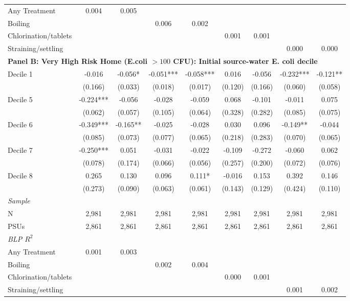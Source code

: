 \begin{landscape}
\begin{table}[p]
\begin{adjustbox}{max width=\linewidth, center}
\begin{tabular}{lcccccccc}
\quad Any Treatment & 0.004 & 0.005 &  &  &  &  &  &  \\
\quad Boiling &  &  & 0.006 & 0.002 &  &  &  &  \\
\quad Chlorination/tablets &  &  &  &  & 0.001 & 0.001 &  &  \\
\quad Straining/settling &  &  &  &  &  &  & 0.000 & 0.000 \\
\midrule
\multicolumn{9}{l}{\textbf{Panel B: Very High Risk Home (E.coli $>100$ CFU): Initial source-water E. coli decile}} \\
Decile 1 & -0.016 & -0.056* & -0.051*** & -0.058*** & 0.016 & -0.056 & -0.232*** & -0.121** \\
 & (0.166) & (0.033) & (0.018) & (0.017) & (0.120) & (0.166) & (0.060) & (0.058) \\
Decile 5 & -0.224*** & -0.056 & -0.028 & -0.059 & 0.068 & -0.101 & -0.011 & 0.075 \\
 & (0.062) & (0.057) & (0.105) & (0.064) & (0.328) & (0.282) & (0.085) & (0.075) \\
Decile 6 & -0.349*** & -0.165** & -0.025 & -0.028 & 0.030 & 0.096 & -0.149** & -0.044 \\
 & (0.085) & (0.073) & (0.077) & (0.065) & (0.218) & (0.283) & (0.070) & (0.065) \\
Decile 7 & -0.250*** & 0.051 & -0.031 & -0.022 & -0.109 & -0.272 & -0.060 & 0.062 \\
 & (0.078) & (0.174) & (0.066) & (0.056) & (0.257) & (0.200) & (0.072) & (0.076) \\
Decile 8 & 0.265 & 0.130 & 0.096 & 0.111* & -0.016 & 0.153 & 0.392 & 0.146 \\
 & (0.273) & (0.090) & (0.063) & (0.061) & (0.143) & (0.129) & (0.424) & (0.110) \\
\multicolumn{9}{l}{\textit{Sample}} \\
\quad N & 2,981 & 2,981 & 2,981 & 2,981 & 2,981 & 2,981 & 2,981 & 2,981 \\
\quad PSUs & 2,861 & 2,861 & 2,861 & 2,861 & 2,861 & 2,861 & 2,861 & 2,861 \\
\multicolumn{9}{l}{\textit{BLP $R^{2}$}} \\
\quad Any Treatment & 0.001 & 0.003 &  &  &  &  &  &  \\
\quad Boiling &  &  & 0.002 & 0.004 &  &  &  &  \\
\quad Chlorination/tablets &  &  &  &  & 0.000 & 0.001 &  &  \\
\quad Straining/settling &  &  &  &  &  &  & 0.001 & 0.002 \\

\end{tabular}
\end{adjustbox}
\end{table}
\end{landscape}
